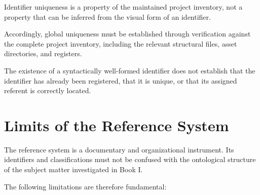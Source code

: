Identifier uniqueness is a property of the maintained
project inventory, not a property that can be inferred
from the visual form of an identifier.

Accordingly, global uniqueness must be established
through verification against the complete project
inventory, including the relevant structural files,
asset directories, and registers.

The existence of a syntactically well-formed identifier
does not establish that the identifier has already been
registered, that it is unique, or that its assigned
referent is correctly located.



\section*{Limits of the Reference System}

The reference system is a documentary and organizational
instrument. Its identifiers and classifications must
not be confused with the ontological structure of the
subject matter investigated in Book I.

The following limitations are therefore fundamental:

